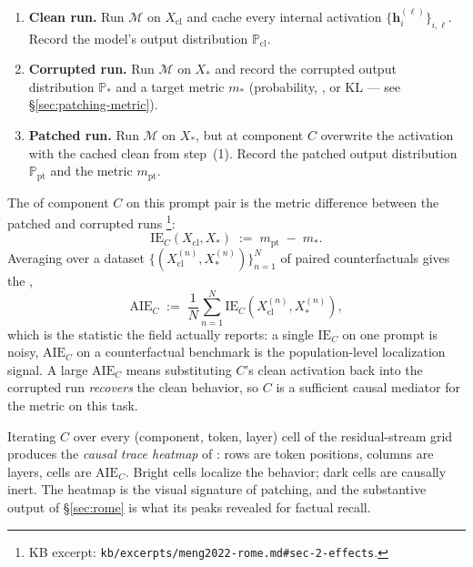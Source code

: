 \begin{enumerate}
  \item \textbf{Clean run.} Run $\mathcal{M}$ on $X_{\text{cl}}$ and
    cache every internal activation
    $\{\mathbf{h}_i^{(\ell)}\}_{i,\ell}$. Record the model's output
    distribution $\mathbb{P}_{\text{cl}}$.
  \item \textbf{Corrupted run.} Run $\mathcal{M}$ on $X_{*}$ and record
    the corrupted output distribution $\mathbb{P}_{*}$ and a target
    metric $m_{*}$ (probability, , or KL --- see
    \S\ref{sec:patching-metric}).
  \item \textbf{Patched run.} Run $\mathcal{M}$ on $X_{*}$, but at
    component $C$ overwrite the activation with the cached clean 
    from step~(1). Record the patched output distribution
    $\mathbb{P}_{\text{pt}}$ and the metric $m_{\text{pt}}$.
\end{enumerate}

The \emph{} of component $C$ on this prompt pair is the
metric difference between the patched and corrupted runs
\citep[\S 2]{meng2022-rome}\footnote{KB excerpt:
\texttt{kb/excerpts/meng2022-rome.md\#sec-2-effects}.}:
\begin{equation}
  \mathrm{IE}_C(X_{\text{cl}}, X_{*}) \;:=\; m_{\text{pt}} \;-\; m_{*}.
  \label{eq:ie-definition}
\end{equation}
Averaging over a dataset $\{(X_{\text{cl}}^{(n)}, X_{*}^{(n)})\}_{n=1}^{N}$
of paired counterfactuals gives the \emph{}
\citep[\S 2]{meng2022-rome},
\begin{equation}
  \mathrm{AIE}_C \;:=\;
  \frac{1}{N} \sum_{n=1}^{N} \mathrm{IE}_C(X_{\text{cl}}^{(n)}, X_{*}^{(n)}),
  \label{eq:aie}
\end{equation}
which is the statistic the field actually reports: a single
$\mathrm{IE}_C$ on one prompt is noisy, $\mathrm{AIE}_C$ on a
counterfactual benchmark is the population-level localization signal.
A large $\mathrm{AIE}_C$ means substituting $C$'s clean activation back
into the corrupted run \emph{recovers} the clean behavior, so $C$ is a
sufficient causal mediator for the metric on this task.

Iterating $C$ over every (component, token, layer) cell of the
residual-stream grid produces the \emph{causal trace heatmap} of
\citet[Fig.~1]{meng2022-rome}: rows are token positions, columns are
layers, cells are $\mathrm{AIE}_C$. Bright cells localize the behavior;
dark cells are causally inert. The heatmap is the visual signature of
patching, and the substantive output of \S\ref{sec:rome} is what its
peaks revealed for factual recall.

